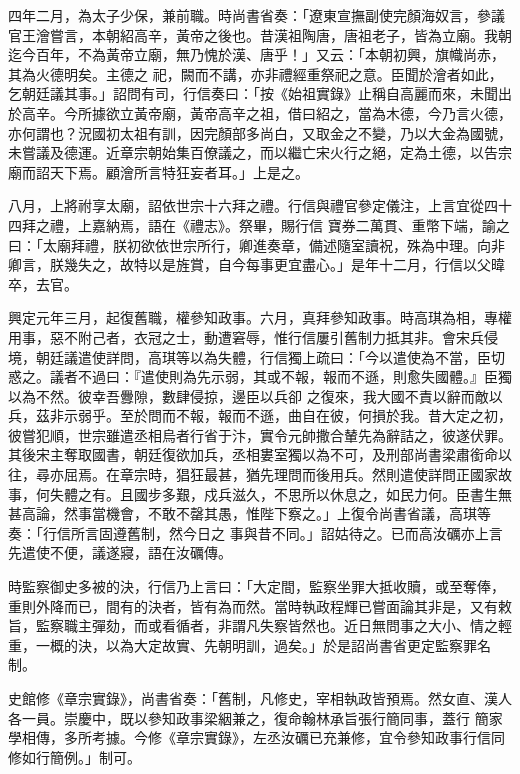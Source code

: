 \begin{pinyinscope}
 四年二月，為太子少保，兼前職。時尚書省奏：「遼東宣撫副使完顏海奴言，參議官王澮嘗言，本朝紹高辛，黃帝之後也。昔漢祖陶唐，唐祖老子，皆為立廟。我朝迄今百年，不為黃帝立廟，無乃愧於漢、唐乎！」又云：「本朝初興，旗幟尚赤，其為火德明矣。主德之
 祀，闕而不講，亦非禮經重祭祀之意。臣聞於澮者如此，乞朝廷議其事。」詔問有司，行信奏曰：「按《始祖實錄》止稱自高麗而來，未聞出於高辛。今所據欲立黃帝廟，黃帝高辛之祖，借曰紹之，當為木德，今乃言火德，亦何謂也？況國初太祖有訓，因完顏部多尚白，又取金之不變，乃以大金為國號，未嘗議及德運。近章宗朝始集百僚議之，而以繼亡宋火行之絕，定為土德，以告宗廟而詔天下焉。顧澮所言特狂妄者耳。」上是之。



 八月，上將祔享太廟，詔依世宗十六拜之禮。行信與禮官參定儀注，上言宜從四十四拜之禮，上嘉納焉，語在《禮志》。祭畢，賜行信
 寶券二萬貫、重幣下端，諭之曰：「太廟拜禮，朕初欲依世宗所行，卿進奏章，備述隨室讀祝，殊為中理。向非卿言，朕幾失之，故特以是旌賞，自今每事更宜盡心。」是年十二月，行信以父暐卒，去官。



 興定元年三月，起復舊職，權參知政事。六月，真拜參知政事。時高琪為相，專權用事，惡不附己者，衣冠之士，動遭窘辱，惟行信屢引舊制力抵其非。會宋兵侵境，朝廷議遣使詳問，高琪等以為失體，行信獨上疏曰：「今以遣使為不當，臣切惑之。議者不過曰：『遣使則為先示弱，其或不報，報而不遜，則愈失國體。』臣獨以為不然。彼幸吾釁隙，數肆侵掠，邊臣以兵卻
 之復來，我大國不責以辭而敵以兵，茲非示弱乎。至於問而不報，報而不遜，曲自在彼，何損於我。昔大定之初，彼嘗犯順，世宗雖遣丞相烏者行省于汴，實令元帥撒合輦先為辭詰之，彼遂伏罪。其後宋主奪取國書，朝廷復欲加兵，丞相婁室獨以為不可，及刑部尚書梁肅銜命以往，尋亦屈焉。在章宗時，猖狂最甚，猶先理問而後用兵。然則遣使詳問正國家故事，何失體之有。且國步多艱，戍兵滋久，不思所以休息之，如民力何。臣書生無甚高論，然事當機會，不敢不罄其愚，惟陛下察之。」上復令尚書省議，高琪等奏：「行信所言固遵舊制，然今日之
 事與昔不同。」詔姑待之。已而高汝礪亦上言先遣使不便，議遂寢，語在汝礪傳。



 時監察御史多被的決，行信乃上言曰：「大定間，監察坐罪大抵收贖，或至奪俸，重則外降而已，間有的決者，皆有為而然。當時執政程輝已嘗面論其非是，又有敕旨，監察職主彈劾，而或看循者，非謂凡失察皆然也。近日無問事之大小、情之輕重，一概的決，以為大定故實、先朝明訓，過矣。」於是詔尚書省更定監察罪名制。



 史館修《章宗實錄》，尚書省奏：「舊制，凡修史，宰相執政皆預焉。然女直、漢人各一員。崇慶中，既以參知政事梁絪兼之，復命翰林承旨張行簡同事，蓋行
 簡家學相傳，多所考據。今修《章宗實錄》，左丞汝礪已充兼修，宜令參知政事行信同修如行簡例。」制可。




\end{pinyinscope}
